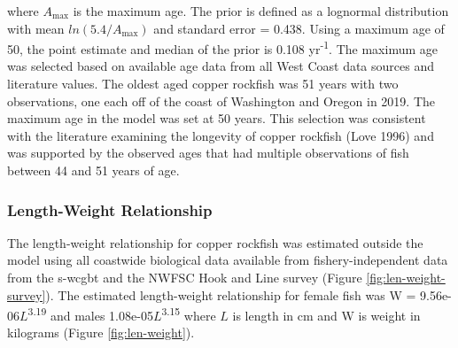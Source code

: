\documentclass[11pt,
  english,
  a4paper,
]{article}
\begin{document}
\vspace{0.5cm}


where {\(A_{\text{max}}\)\leavevmode\tagmcend\tagstructend} is the maximum age. The prior is defined as a lognormal distribution with mean {\(ln(5.4/A_{\text{max}})\)\leavevmode\tagmcend\tagstructend} and standard error = 0.438. Using a maximum age of 50, the point estimate and median of the prior is 0.108 yr\textsuperscript{-1}. The maximum age was selected based on available age data from all West Coast data sources and literature values. The oldest aged copper rockfish was 51 years with two observations, one each off of the coast of Washington and Oregon in 2019. The maximum age in the model was set at 50 years. This selection was consistent with the literature examining the longevity of copper rockfish {(Love 1996)\leavevmode\tagmcend\tagstructend} and was supported by the observed ages that had multiple observations of fish between 44 and 51 years of age.

\leavevmode\tagmcend\tagstructend\par


\hypertarget{length-weight-relationship}{%
\subsubsection{Length-Weight Relationship}\label{length-weight-relationship}}

\leavevmode\tagmcend\tagstructend


The length-weight relationship for copper rockfish was estimated outside the model using all coastwide biological data available from fishery-independent data from the \gls{s-wcgbt} and the NWFSC Hook and Line survey (Figure \ref{fig:len-weight-survey}). The estimated length-weight relationship for female fish was W = 9.56e-06{\(L\)\leavevmode\tagmcend\tagstructend}\textsuperscript{3.19} and males 1.08e-05{\(L\)\leavevmode\tagmcend\tagstructend}\textsuperscript{3.15} where {\(L\)\leavevmode\tagmcend\tagstructend} is length in cm and W is weight in kilograms (Figure \ref{fig:len-weight}).
\end{document}
